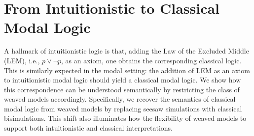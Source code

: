 \section{From Intuitionistic to Classical Modal Logic}

A hallmark of intuitionistic logic is that, adding the Law of the Excluded Middle (LEM), i.e., $p \lor \lnot p$, as an axiom, one obtains the corresponding classical logic.
This is similarly expected in the modal setting: the addition of LEM as an axiom to intuitionistic modal logic should yield a classical modal logic. We show how this correspondence can be understood semantically by restricting the class of weaved models accordingly. Specifically, we recover the semantics of classical modal logic from weaved models by replacing seesaw simulations with classical bisimulations. This shift also illuminates how the flexibility of weaved models to support both intuitionistic and classical interpretations.



